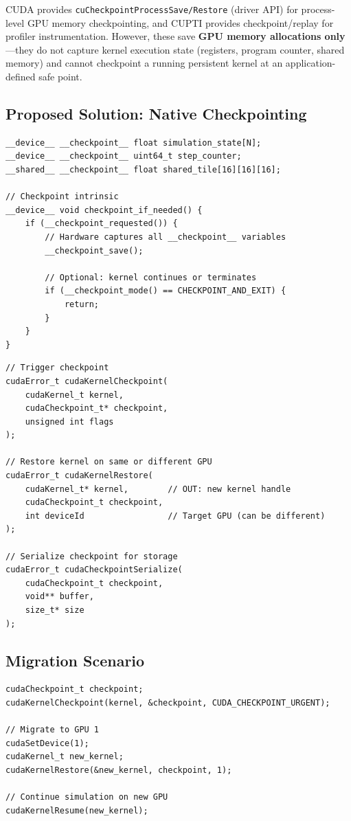 \documentclass[11pt,a4paper]{article}
\begin{document}
CUDA provides \texttt{cuCheckpointProcessSave/Restore} (driver API) for process-level GPU memory checkpointing, and CUPTI provides checkpoint/replay for profiler instrumentation. However, these save \textbf{GPU memory allocations only}---they do not capture kernel execution state (registers, program counter, shared memory) and cannot checkpoint a running persistent kernel at an application-defined safe point.

\subsection{Proposed Solution: Native Checkpointing}

\begin{lstlisting}[style=cstyle,title={Device side - declare checkpointable state}]
__device__ __checkpoint__ float simulation_state[N];
__device__ __checkpoint__ uint64_t step_counter;
__shared__ __checkpoint__ float shared_tile[16][16][16];

// Checkpoint intrinsic
__device__ void checkpoint_if_needed() {
    if (__checkpoint_requested()) {
        // Hardware captures all __checkpoint__ variables
        __checkpoint_save();

        // Optional: kernel continues or terminates
        if (__checkpoint_mode() == CHECKPOINT_AND_EXIT) {
            return;
        }
    }
}
\end{lstlisting}

\begin{lstlisting}[style=cstyle,title={Host-side API}]
// Trigger checkpoint
cudaError_t cudaKernelCheckpoint(
    cudaKernel_t kernel,
    cudaCheckpoint_t* checkpoint,
    unsigned int flags
);

// Restore kernel on same or different GPU
cudaError_t cudaKernelRestore(
    cudaKernel_t* kernel,        // OUT: new kernel handle
    cudaCheckpoint_t checkpoint,
    int deviceId                 // Target GPU (can be different)
);

// Serialize checkpoint for storage
cudaError_t cudaCheckpointSerialize(
    cudaCheckpoint_t checkpoint,
    void** buffer,
    size_t* size
);
\end{lstlisting}

\subsection{Migration Scenario}

\begin{lstlisting}[style=cstyle,title={GPU 0 has failing VRAM}]
cudaCheckpoint_t checkpoint;
cudaKernelCheckpoint(kernel, &checkpoint, CUDA_CHECKPOINT_URGENT);

// Migrate to GPU 1
cudaSetDevice(1);
cudaKernel_t new_kernel;
cudaKernelRestore(&new_kernel, checkpoint, 1);

// Continue simulation on new GPU
cudaKernelResume(new_kernel);
\end{lstlisting}
\end{document}
